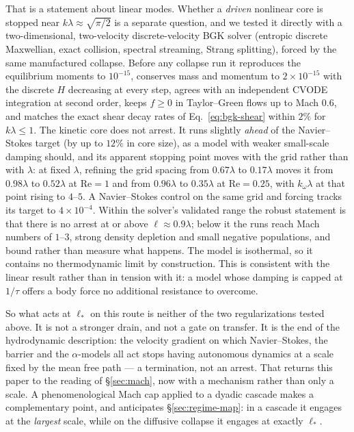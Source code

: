 \documentclass[11pt,a4paper]{article}
\begin{document}
That is a statement about linear modes. Whether a \emph{driven} nonlinear core is stopped near
$k\lambda\approx\sqrt{\pi/2}$ is a separate question, and we tested it directly with a
two-dimensional, two-velocity discrete-velocity BGK solver (entropic discrete Maxwellian, exact
collision, spectral streaming, Strang splitting), forced by the same manufactured collapse. Before any
collapse run it reproduces the equilibrium moments to $10^{-15}$, conserves mass and momentum to
$2\times10^{-15}$ with the discrete $H$ decreasing at every step, agrees with an independent CVODE
integration at second order, keeps $f\ge0$ in Taylor--Green flows up to Mach $0.6$, and matches the
exact shear decay rates of Eq.~\eqref{eq:bgk-shear} within $2\%$ for $k\lambda\le1$. The kinetic
core does not arrest. It runs slightly \emph{ahead} of the Navier--Stokes target (by up to $12\%$ in
core size), as a model with weaker small-scale damping should, and its apparent stopping point moves
with the grid rather than with $\lambda$: at fixed $\lambda$, refining the grid spacing from $0.67\lambda$
to $0.17\lambda$ moves it from $0.98\lambda$ to $0.52\lambda$ at $\mathrm{Re}=1$ and from $0.96\lambda$
to $0.35\lambda$ at $\mathrm{Re}=0.25$, with $k_\omega\lambda$ at that point rising to $4$--$5$. A
Navier--Stokes control on the same grid and forcing tracks its target to $4\times10^{-4}$. Within the
solver's validated range the robust statement is that there is no arrest at or above
$\ell\approx0.9\lambda$; below it the runs reach Mach numbers of $1$--$3$, strong density depletion and
small negative populations, and bound rather than measure what happens. The model is isothermal, so
it contains no thermodynamic limit by construction. This is consistent with the linear result rather
than in tension with it: a model whose damping is capped at $1/\tau$ offers a body force no
additional resistance to overcome.

So what acts at $\ell_*$ on this route is neither of the two regularizations tested above. It is not
a stronger drain, and not a gate on transfer. It is the end of the hydrodynamic description: the
velocity gradient on which Navier--Stokes, the barrier and the $\alpha$-models all act stops having
autonomous dynamics at a scale fixed by the mean free path --- a termination, not an arrest. That
returns this paper to the reading of \S\ref{sec:mach}, now with a mechanism rather than only a scale.
A phenomenological Mach cap applied to a dyadic cascade makes a complementary point, and anticipates
\S\ref{sec:regime-map}: in a cascade it engages at the \emph{largest} scale, while on the diffusive
collapse it engages at exactly $\ell_*$.
\end{document}
